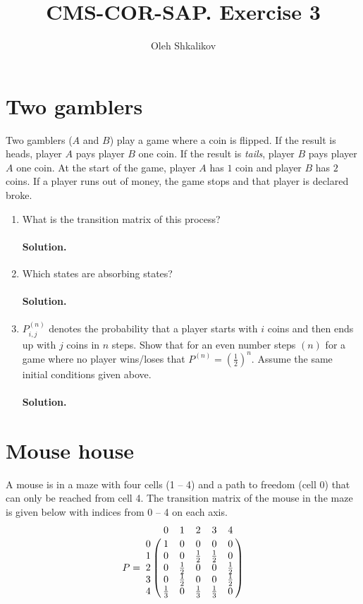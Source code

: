 \documentclass[a4paper, 12pt]{article}
\title{CMS-COR-SAP. Exercise 3}
\author{Oleh Shkalikov}
\newcommand{\rbra}[1]{\left( #1 \right)}
\newcommand{\sol}[1]{\paragraph{Solution.} #1}
\newcommand{\task}[2]{
    \item #1 \sol{#2}
}
\begin{document}
\maketitle

\section{Two gamblers}
Two gamblers ($A$ and $B$) play a game where a coin is flipped. If the result is heads, player
$A$ pays player $B$ one coin. If the result is \textit{tails}, player $B$ pays player $A$ one coin. At the
start of the game, player $A$ has $1$ coin and player $B$ has $2$ coins. If a player runs out of
money, the game stops and that player is declared broke.

\begin{enumerate}
    \task{What is the transition matrix of this process?}
    {

    }
    \task{Which states are absorbing states?}
    {

    }
    \task{$P^{(n)}_{i,j}$ denotes the probability that a player starts with $i$ coins and then ends up with $j$
        coins in $n$ steps. Show that for an even number steps $(n)$ for a game where no player
        wins/loses that $P^{(n)} = \rbra{\frac{1}{2}}^n $. Assume the same initial conditions given above.}
    {

    }
\end{enumerate}

\section{Mouse house}
A mouse is in a maze with four cells (1 -- 4) and a path to freedom (cell 0) that can only
be reached from cell 4. The transition matrix of the mouse in the maze is given below with
indices from 0 -- 4 on each axis.
\[
    P = \bordermatrix{
        & 0 & 1 & 2 & 3 & 4 \cr
        0 & 1 & 0 & 0 & 0 & 0 \cr
        1 & 0 & 0 & \frac{1}{2} & \frac{1}{2} & 0 \cr
        2 & 0 & \frac{1}{2} & 0 & 0 & \frac{1}{2} \cr
        3 & 0 & \frac{1}{2} & 0 & 0 & \frac{1}{2} \cr
        4 & \frac{1}{3} & 0 & \frac{1}{3} & \frac{1}{3} & 0
    }
\]
\end{document}
